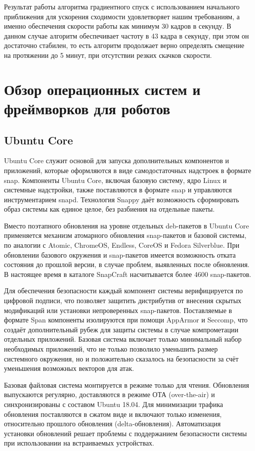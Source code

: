 \documentclass[a4paper,12pt]{article}
\begin{document}
Результат работы алгоритма градиентного спуск с использованием начального приближения для ускорения сходимости удовлетворяет нашим требованиям, а именно обеспечения скорости работы как минимум 30 кадров в секунду. В данном случае алгоритм обеспечивает частоту в 43 кадра в секунду, при этом он достаточно стабилен, то есть алгоритм продолжает верно определять смещение на протяжении до 5 минут, при отсутствии резких скачков скорости.

\section{Обзор операционных систем и фреймворков для роботов}

\subsection{Ubuntu Core}
Ubuntu Core служит основой для запуска дополнительных компонентов и приложений, которые оформляются в виде самодостаточных надстроек в формате snap. Компоненты Ubuntu Core, включая базовую систему, ядро Linux и системные надстройки, также поставляются в формате snap и управляются инструментарием snapd. Технология Snappy даёт возможность сформировать образ системы как единое целое, без разбиения на отдельные пакеты.

Вместо поэтапного обновления на уровне отдельных deb-пакетов в Ubuntu Core применяется механизм атомарного обновления snap-пакетов и базовой системы, по аналогии с Atomic, ChromeOS, Endless, CoreOS и Fedora Silverblue. При обновлении базового окружения и snap-пакетов имеется возможность отката состояния до прошлой версии, в случае проблем, выявленных после обновления. В настоящее время в каталоге SnapCraft насчитывается более 4600 snap-пакетов.

Для обеспечения безопасности каждый компонент системы верифицируется по цифровой подписи, что позволяет защитить дистрибутив от внесения скрытых модификаций или установки непроверенных snap-пакетов. Поставляемые в формате Span компоненты изолируются при помощи AppArmor и Seccomp, что создаёт дополнительный рубеж для защиты системы в случае компрометации отдельных приложений. Базовая система включает только минимальный набор необходимых приложений, что не только позволило уменьшить размер системного окружения, но и положительно сказалось на безопасности за счёт уменьшения возможных векторов для атак.

Базовая файловая система монтируется в режиме только для чтения. Обновления выпускаются регулярно, доставляются в режиме ОТА (over-the-air) и синхронизированы с составом Ubuntu 18.04. Для минимизации трафика обновления поставляются в сжатом виде и включают только изменения, относительно прошлого обновления (delta-обновления). Автоматизация установки обновлений решает проблемы с поддержанием безопасности системы при использовании на встраиваемых устройствах.
\end{document}
